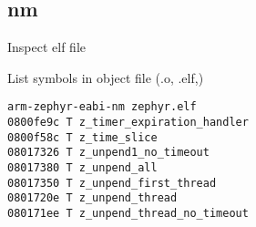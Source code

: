 \subsection{nm}

\begin{frame}[fragile]{Inspect elf file}
  \begin{exampleblock}{List symbols in object file (.o, .elf,)}
    \begin{lstlisting}[showstringspaces=false]
arm-zephyr-eabi-nm zephyr.elf
0800fe9c T z_timer_expiration_handler
0800f58c T z_time_slice
08017326 T z_unpend1_no_timeout
08017380 T z_unpend_all
08017350 T z_unpend_first_thread
0801720e T z_unpend_thread
080171ee T z_unpend_thread_no_timeout
    \end{lstlisting}
  \end{exampleblock}
\end{frame}
